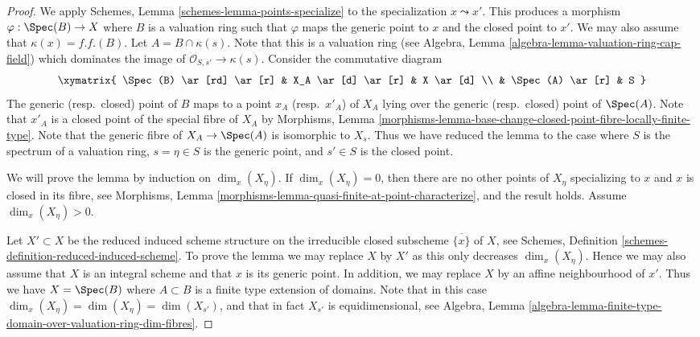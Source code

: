 \begin{proof}
We apply
Schemes, Lemma \ref{schemes-lemma-points-specialize}
to the specialization $x \leadsto x'$.
This produces a morphism $\varphi : \Spec(B) \to X$
where $B$ is a valuation ring such that $\varphi$ maps the
generic point to $x$ and the closed point to $x'$. We may also
assume that $\kappa(x) = f.f.(B)$.
Let $A = B \cap \kappa(s)$. Note that this is a valuation ring (see
Algebra, Lemma \ref{algebra-lemma-valuation-ring-cap-field})
which dominates the image of $\mathcal{O}_{S, s'} \to \kappa(s)$.
Consider the commutative diagram
$$
\xymatrix{
\Spec(B) \ar[rd] \ar[r] &
X_A \ar[d] \ar[r] & X \ar[d] \\
& \Spec(A) \ar[r] & S
}
$$
The generic (resp.\ closed) point of $B$ maps to a point $x_A$
(resp.\ $x'_A$) of $X_A$ lying over the generic (resp.\ closed)
point of $\Spec(A)$. Note that $x'_A$ is a closed point
of the special fibre of $X_A$ by
Morphisms,
Lemma \ref{morphisms-lemma-base-change-closed-point-fibre-locally-finite-type}.
Note that the generic fibre of $X_A \to \Spec(A)$ is isomorphic
to $X_s$. Thus we have reduced the lemma to the case where $S$ is
the spectrum of a valuation ring, $s = \eta \in S$ is the generic point, and
$s' \in S$ is the closed point.

\medskip\noindent
We will prove the lemma by induction on $\dim_x(X_\eta)$.
If $\dim_x(X_\eta) = 0$, then there are no other points of $X_\eta$
specializing to $x$ and $x$ is closed in its fibre, see
Morphisms, Lemma \ref{morphisms-lemma-quasi-finite-at-point-characterize},
and the result holds. Assume $\dim_x(X_\eta) > 0$.

\medskip\noindent
Let $X' \subset X$ be the reduced induced scheme structure on
the irreducible closed subscheme $\overline{\{x\}}$ of $X$, see
Schemes, Definition \ref{schemes-definition-reduced-induced-scheme}.
To prove the lemma we may replace $X$ by $X'$ as this only decreases
$\dim_x(X_\eta)$. Hence we may also assume that $X$ is an integral scheme
and that $x$ is its generic point. In addition, we may replace $X$ by an
affine neighbourhood of $x'$. Thus we have $X = \Spec(B)$ where
$A \subset B$ is a finite type extension of domains. Note that in
this case $\dim_x(X_\eta) = \dim(X_\eta) = \dim(X_{s'})$, and that in fact
$X_{s'}$ is equidimensional, see
Algebra,
Lemma \ref{algebra-lemma-finite-type-domain-over-valuation-ring-dim-fibres}.


\end{proof}
